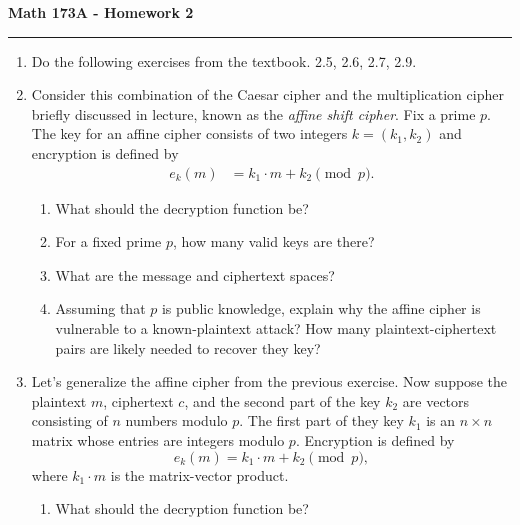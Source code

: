 \documentclass[11pt,letterpaper]{article}
\begin{document}
\begin{center}
{\bf \Large Math 173A - Homework 2}
\vspace{0.2cm}
\hrule
\end{center}



\begin{enumerate}

    \item Do the following exercises from the textbook. 2.5, 2.6, 2.7, 2.9.

    \item Consider this combination of the Caesar cipher and the multiplication cipher briefly discussed in lecture, known as the \emph{affine shift cipher}.
    Fix a prime $p$.
    The key for an affine cipher consists of two integers $k = (k_1, k_2)$ and encryption is defined by
    \begin{align*}
        e_k(m) &= k_1\cdot m + k_2\pmod p.
    \end{align*}
    \begin{enumerate}
        \item What should the decryption function be?

        \item For a fixed prime $p$, how many valid keys are there?

        \item What are the message and ciphertext spaces?

        \item Assuming that $p$ is public knowledge, explain why the affine cipher is vulnerable to a known-plaintext attack?
        How many plaintext-ciphertext pairs are likely needed to recover they key?
    \end{enumerate}


    \item Let's generalize the affine cipher from the previous exercise.
    Now suppose the plaintext $m$, ciphertext $c$, and the second part of the key $k_2$ are vectors consisting of $n$ numbers modulo $p$.
    The first part of they key $k_1$ is an $n\times n$ matrix whose entries are integers modulo $p$.
    Encryption is defined by
    \[
        e_k(m) = k_1\cdot m + k_2 \pmod p,
    \]
    where $k_1\cdot m$ is the matrix-vector product.
    \begin{enumerate}
        \item What should the decryption function be?


\end{enumerate}
\end{enumerate}
\end{document}
